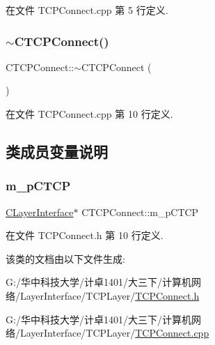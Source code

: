 在文件 T\+C\+P\+Connect.\+cpp 第 5 行定义.

\mbox{\label{class_c_t_c_p_connect_a9f5247e1a88170a943ba0b5c4b07b26c}} 
\subsubsection{\texorpdfstring{$\sim$\+C\+T\+C\+P\+Connect()}{~CTCPConnect()}}
{\footnotesize\ttfamily C\+T\+C\+P\+Connect\+::$\sim$\+C\+T\+C\+P\+Connect (\begin{DoxyParamCaption}{ }\end{DoxyParamCaption})}



在文件 T\+C\+P\+Connect.\+cpp 第 10 行定义.



\subsection{类成员变量说明}
\mbox{\label{class_c_t_c_p_connect_a0418f1607ff29af6941d080cf5896df7}} 
\subsubsection{\texorpdfstring{m\+\_\+p\+C\+T\+CP}{m\_pCTCP}}
{\footnotesize\ttfamily \hyperlink{class_c_layer_interface}{C\+Layer\+Interface}$\ast$ C\+T\+C\+P\+Connect\+::m\+\_\+p\+C\+T\+CP}



在文件 T\+C\+P\+Connect.\+h 第 10 行定义.



该类的文档由以下文件生成\+:\begin{DoxyCompactItemize}
\item 
G\+:/华中科技大学/计卓1401/大三下/计算机网络/\+Layer\+Interface/\+T\+C\+P\+Layer/\hyperlink{_t_c_p_connect_8h}{T\+C\+P\+Connect.\+h}\item 
G\+:/华中科技大学/计卓1401/大三下/计算机网络/\+Layer\+Interface/\+T\+C\+P\+Layer/\hyperlink{_t_c_p_connect_8cpp}{T\+C\+P\+Connect.\+cpp}\end{DoxyCompactItemize}
